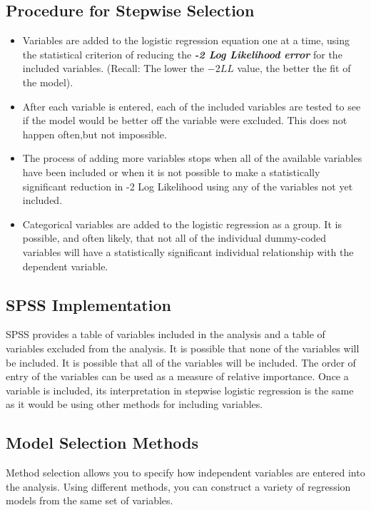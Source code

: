 \documentclass[a4paper,12pt]{article}
\begin{document}
\subsection{Procedure for Stepwise Selection}
\begin{itemize}
	\item Variables are added to the logistic regression equation one at a time, using the statistical criterion of reducing the \textbf{\textit{-2 Log Likelihood error}} for the included variables. (Recall: The lower the $-2LL$ value, the better the fit of the model).
	
\item After each variable is entered, each of the included variables are tested to see if the model would be better off the variable were excluded. This does not happen often,but not impossible.
	
\item The process of adding more variables stops when all of the available variables have been included or when it is not possible to make a statistically significant reduction in -2 Log Likelihood using any of the variables not yet included.
	
\item Categorical variables are added to the logistic regression as a group. It is possible, and often likely, that not all of the individual dummy-coded variables will have a statistically significant individual relationship with the dependent variable. 
\end{itemize}

\subsection{SPSS Implementation}
SPSS provides a table of variables included in the analysis and a table of variables excluded from the analysis.  
It is possible that none of the variables will be included.  
It is possible that all of the variables will be included.
The order of entry of the variables can be used as a measure of relative importance.
Once a variable is included, its interpretation in stepwise logistic regression is the same as it would be using other methods for including variables.




\subsection*{Model Selection Methods}
Method selection allows you to specify how independent variables are entered into the analysis.
Using different methods, you can construct a variety of regression models from the same set of
variables.
\end{document}

